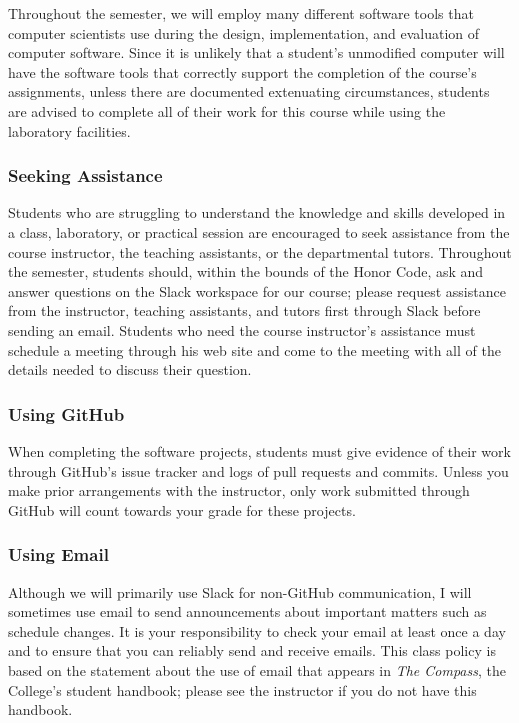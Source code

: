 \documentclass[11pt]{article}
\newcommand{\instructorpronoun}[1]{his}
\begin{document}
Throughout the semester, we will employ many different software tools that
computer scientists use during the design, implementation, and evaluation of
computer software. Since it is unlikely that a student's unmodified computer
will have the software tools that correctly support the completion of the
course's assignments, unless there are documented extenuating circumstances,
students are advised to complete all of their work for this course while using
the laboratory facilities.

\subsubsection*{Seeking Assistance}

Students who are struggling to understand the knowledge and skills developed in
a class, laboratory, or practical session are encouraged to seek assistance from
the course instructor, the teaching assistants, or the departmental tutors.
Throughout the semester, students should, within the bounds of the Honor Code,
ask and answer questions on the Slack workspace for our course; please request
assistance from the instructor, teaching assistants, and tutors first through
Slack before sending an email. Students who need the course instructor's
assistance must schedule a meeting through \instructorpronoun{} web site and
come to the meeting with all of the details needed to discuss their question.

\subsubsection*{Using GitHub}

When completing the software projects, students must give evidence of their work
through GitHub's issue tracker and logs of pull requests and commits. Unless you
make prior arrangements with the instructor, only work submitted through GitHub
will count towards your grade for these projects.

\subsubsection*{Using Email}

Although we will primarily use Slack for non-GitHub communication, I will
sometimes use email to send announcements about important matters such as
schedule changes. It is your responsibility to check your email at least once a
day and to ensure that you can reliably send and receive emails. This class
policy is based on the statement about the use of email that appears in {\em The
Compass}, the College's student handbook; please see the instructor if you do
not have this handbook.
\end{document}
